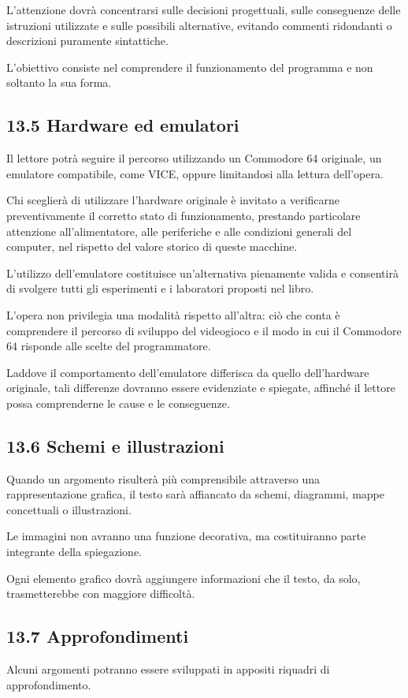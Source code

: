 \documentclass{article}
\begin{document}
L'attenzione dovrà concentrarsi sulle decisioni progettuali, sulle conseguenze delle istruzioni utilizzate e sulle
possibili alternative, evitando commenti ridondanti o descrizioni puramente sintattiche.

L'obiettivo consiste nel comprendere il funzionamento del programma e non soltanto la sua forma.

\subsection{13.5 Hardware ed emulatori}
Il lettore potrà seguire il percorso utilizzando un Commodore 64 originale, un emulatore compatibile, come VICE, oppure
limitandosi alla lettura dell'opera.

Chi sceglierà di utilizzare l'hardware originale è invitato a verificarne preventivamente il corretto stato di
funzionamento, prestando particolare attenzione all'alimentatore, alle periferiche e alle condizioni generali del
computer, nel rispetto del valore storico di queste macchine.

L'utilizzo dell'emulatore costituisce un'alternativa pienamente valida e consentirà di svolgere tutti gli esperimenti e
i laboratori proposti nel libro.

L'opera non privilegia una modalità rispetto all'altra: ciò che conta è comprendere il percorso di sviluppo del
videogioco e il modo in cui il Commodore 64 risponde alle scelte del programmatore.

Laddove il comportamento dell'emulatore differisca da quello dell'hardware originale, tali differenze dovranno essere
evidenziate e spiegate, affinché il lettore possa comprenderne le cause e le conseguenze.

\subsection{13.6 Schemi e illustrazioni}
Quando un argomento risulterà più comprensibile attraverso una rappresentazione grafica, il testo sarà affiancato da
schemi, diagrammi, mappe concettuali o illustrazioni.

Le immagini non avranno una funzione decorativa, ma costituiranno parte integrante della spiegazione.

Ogni elemento grafico dovrà aggiungere informazioni che il testo, da solo, trasmetterebbe con maggiore difficoltà.

\subsection{13.7 Approfondimenti}
Alcuni argomenti potranno essere sviluppati in appositi riquadri di approfondimento.
\end{document}
